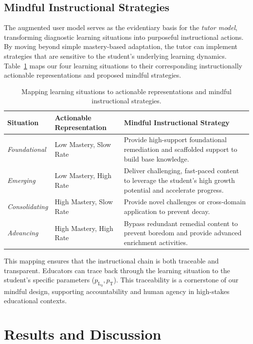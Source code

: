 \documentclass[runningheads]{llncs}
\begin{document}
%
\subsection{Mindful Instructional Strategies}
\label{sec_strategies}

The augmented user model serves as the evidentiary basis for the \textit{tutor model}, transforming diagnostic learning situations into purposeful instructional actions. By moving beyond simple mastery-based adaptation, the tutor can implement strategies that are sensitive to the student's underlying learning dynamics. Table~\ref{tab_strategies} maps our four learning situations to their corresponding instructionally actionable representations and proposed mindful strategies.

\begin{table}[htb]
\caption{Mapping learning situations to actionable representations and mindful instructional strategies.}
\label{tab_strategies}
\centering
\footnotesize
\begin{tabularx}{\textwidth}{l X X}
\toprule
\textbf{Situation} & \textbf{Actionable Representation} & \textbf{Mindful Instructional Strategy} \\
\midrule
\textit{Foundational} & Low Mastery, Slow Rate & Provide high-support foundational remediation and scaffolded support to build base knowledge. \\
\textit{Emerging} & Low Mastery, High Rate & Deliver challenging, fast-paced content to leverage the student's high growth potential and accelerate progress. \\
\textit{Consolidating} & High Mastery, Slow Rate & Provide novel challenges or cross-domain application to prevent decay. \\
\textit{Advancing} & High Mastery, High Rate & Bypass redundant remedial content to prevent boredom and provide advanced enrichment activities. \\
\bottomrule
\end{tabularx}
\end{table}

This mapping ensures that the instructional chain is both traceable and transparent. Educators can trace back through the learning situation to the student's specific parameters ($p_{\text{L}_0}, p_{\text{T}}$). This traceability is a cornerstone of our mindful design, supporting accountability and human agency in high-stakes educational contexts.

\section{Results and Discussion}
\end{document}
